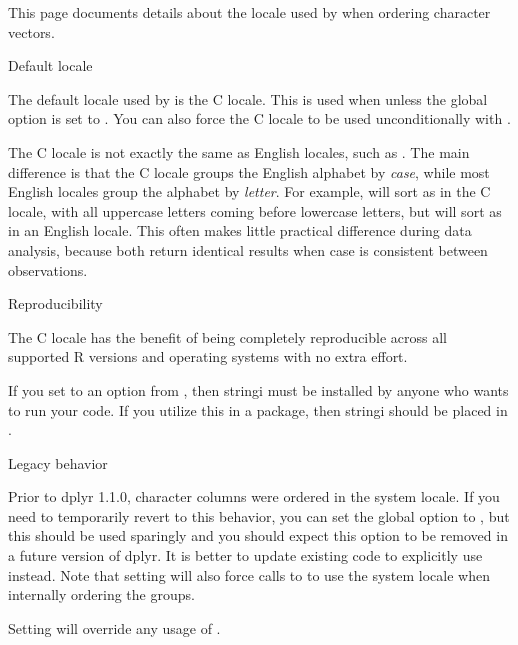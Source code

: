 \documentclass[a4paper]{book}
\begin{document}
%
\begin{Description}
This page documents details about the locale used by  when
ordering character vectors.
%
\begin{SubSection}{Default locale}

The default locale used by  is the C locale. This is used when
 unless the  global option is set to
. You can also force the C locale to be used unconditionally with
.

The C locale is not exactly the same as English locales, such as . The
main difference is that the C locale groups the English alphabet by \emph{case},
while most English locales group the alphabet by \emph{letter}. For example,
 will sort as  in the
C locale, with all uppercase letters coming before lowercase letters, but
will sort as  in an English locale. This often
makes little practical difference during data analysis, because both return
identical results when case is consistent between observations.
\end{SubSection}


%
\begin{SubSection}{Reproducibility}

The C locale has the benefit of being completely reproducible across all
supported R versions and operating systems with no extra effort.

If you set  to an option from , then
stringi must be installed by anyone who wants to run your code. If you
utilize this in a package, then stringi should be placed in .
\end{SubSection}


%
\begin{SubSection}{Legacy behavior}

Prior to dplyr 1.1.0, character columns were ordered in the system locale. If
you need to temporarily revert to this behavior, you can set the global
option  to , but this should be used sparingly and
you should expect this option to be removed in a future version of dplyr. It
is better to update existing code to explicitly use  instead. Note
that setting  will also force calls to  to
use the system locale when internally ordering the groups.

Setting  will override any usage of .
\end{SubSection}

\end{Description}
\end{document}
